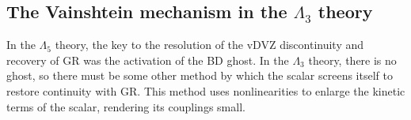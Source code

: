 \documentclass{book}
\theoremstyle{definition}
\begin{document}
\newpage



\subsection{The Vainshtein mechanism in the $\Lambda_3$ theory}



In the $\Lambda_5$ theory, the key to the resolution of the vDVZ discontinuity and recovery of GR was the activation of the BD ghost. In the $\Lambda_3$ theory, there is no ghost, so there must be some other method by which the scalar screens itself to restore continuity with GR. This method uses nonlinearities to enlarge the kinetic terms of the scalar, rendering its couplings small. \\
\end{document}
